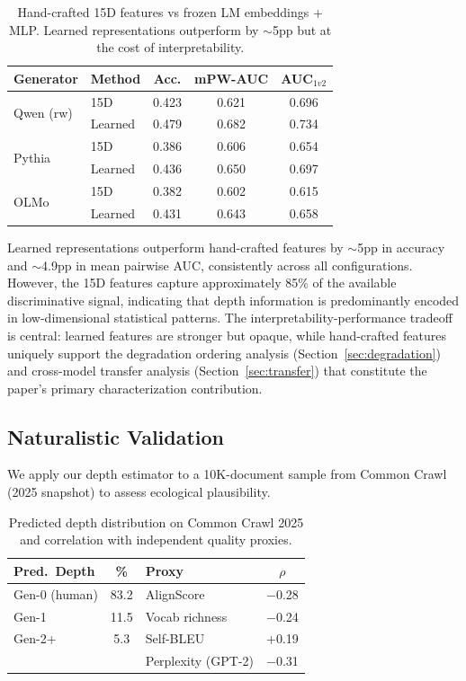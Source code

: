 \documentclass[11pt,a4paper]{article}
\begin{document}
\begin{table}[t]
\centering
\small
\caption{Hand-crafted 15D features vs frozen LM embeddings + MLP. Learned representations outperform by $\sim$5pp but at the cost of interpretability.}
\label{tab:learned}
\begin{tabular}{llccc}
\toprule
\textbf{Generator} & \textbf{Method} & \textbf{Acc.} & \textbf{mPW-AUC} & \textbf{AUC}$_{1v2}$ \\
\midrule
\multirow{2}{*}{Qwen (rw)} & 15D & 0.423 & 0.621 & 0.696 \\
 & Learned & 0.479 & 0.682 & 0.734 \\
\midrule
\multirow{2}{*}{Pythia} & 15D & 0.386 & 0.606 & 0.654 \\
 & Learned & 0.436 & 0.650 & 0.697 \\
\midrule
\multirow{2}{*}{OLMo} & 15D & 0.382 & 0.602 & 0.615 \\
 & Learned & 0.431 & 0.643 & 0.658 \\
\bottomrule
\end{tabular}
\end{table}

Learned representations outperform hand-crafted features by $\sim$5pp in accuracy and $\sim$4.9pp in mean pairwise AUC, consistently across all configurations.
However, the 15D features capture approximately 85\% of the available discriminative signal, indicating that depth information is predominantly encoded in low-dimensional statistical patterns.
The interpretability-performance tradeoff is central: learned features are stronger but opaque, while hand-crafted features uniquely support the degradation ordering analysis (Section~\ref{sec:degradation}) and cross-model transfer analysis (Section~\ref{sec:transfer}) that constitute the paper's primary characterization contribution.

\subsection{Naturalistic Validation}
\label{sec:naturalistic}

We apply our depth estimator to a 10K-document sample from Common Crawl (2025 snapshot) to assess ecological plausibility.

\begin{table}[t]
\centering
\small
\caption{Predicted depth distribution on Common Crawl 2025 and correlation with independent quality proxies.}
\label{tab:naturalistic}
\begin{tabular}{lclc}
\toprule
\textbf{Pred.\ Depth} & \textbf{\%} & \textbf{Proxy} & $\rho$ \\
\midrule
Gen-0 (human) & 83.2 & AlignScore & $-$0.28 \\
Gen-1 & 11.5 & Vocab richness & $-$0.24 \\
Gen-2+ & 5.3 & Self-BLEU & +0.19 \\
 & & Perplexity (GPT-2) & $-$0.31 \\
\bottomrule
\end{tabular}
\end{table}
\end{document}

